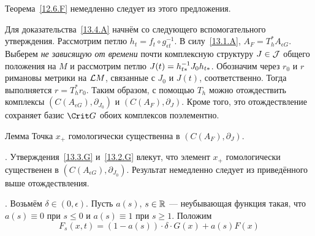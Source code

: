 Теорема~\ref{12.6.F} немедленно следует из этого предложения.

Для доказательства~\ref{13.4.A} начнём со следующего вспомогательного утверждения.
Рассмотрим петлю $h_{t} = f_{t} \circ g_{\epsilon t}^{-1}$.
В силу~\ref{13.1.A}, $A_{F} = T_{h}^{*}A_{\epsilon G}$.
Выберем \emph{не зависящую от времени} почти комплексную структуру
$J\in\mathcal{J}$ общего положения на $M$ и рассмотрим петлю $J(t) \z= h_{t*}^{-1}
J_{0}h_{t*}$. 
Обозначим через $r_{0}$ и $r$ римановы метрики на $\mathcal{L} M$, связанные с $J_{0}$ и $J(t)$, соответственно. 
Тогда выполняется $r = T_{h}^{*}r_{0}$.
Таким образом, с помощью $T_{h}$ можно отождествить комплексы
$(C(A_{\epsilon G}), \partial_{J_{0}})$ и $(C(A_{F}), \partial_{J})$.
Кроме того, это отождествление сохраняет базис $\Crit G$ обоих
комплексов поэлементно.

\begin{thm}{Лемма}\label{13.4.B}
  Точка $x_{+}$ гомологически существенна в $(C(A_{F}), \partial_{J})$.  
\end{thm}

.
Утверждения~\ref{13.3.G} и~\ref{13.2.G} влекут, что
элемент $x_{+}$ гомологически существенен в $(C(A_{\epsilon G}), \partial_{J_{0}})$. 
Результат немедленно следует из приведённого выше отождествления.
\qeds

.
Возьмём $\delta\in(0,\epsilon)$.
Пусть $a(s)$, $s\in\mathbb{R}$ — неубывающая функция такая, что
$a(s)\equiv0$ при $s\le0$ и $a(s)\equiv1$ при $s\ge1$.
Положим
\[
F_{s}(x, t) = (1 - a(s))\cdot\delta\cdot G(x) + a(s)F(x)
\]

